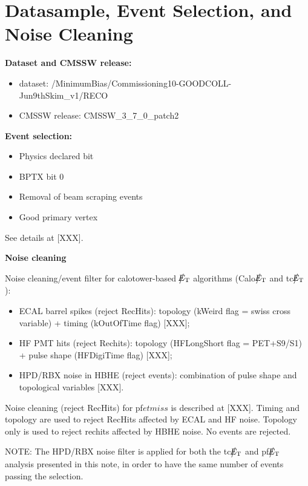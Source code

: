 \section{Datasample, Event Selection, and Noise Cleaning} \label{sec:EventSelection}

{\bf Dataset and CMSSW release:}
\begin{itemize}
\item dataset: /MinimumBias/Commissioning10-GOODCOLL-Jun9thSkim\_v1/RECO
\item CMSSW release: CMSSW\_3\_7\_0\_patch2
\end{itemize}

{\bf Event selection:}
\begin{itemize}
\item Physics declared bit
\item BPTX bit 0
\item Removal of beam scraping events
\item Good primary vertex
\end{itemize}
See details at [XXX].

{\bf Noise cleaning}

Noise cleaning/event filter for calotower-based $\big\slash\hspace{-1.6ex}{E_\text{T}}$ algorithms (Calo$\big\slash\hspace{-1.6ex}{E_\text{T}}$ and tc$\big\slash\hspace{-1.6ex}{E_\text{T}}$):
\begin{itemize}
\item ECAL barrel spikes (reject RecHits): topology (kWeird flag = swiss cross variable) + timing (kOutOfTime flag) [XXX];
\item HF PMT hits (reject Rechits): topology (HFLongShort flag = PET+S9/S1) + pulse shape (HFDigiTime flag) [XXX];
\item HPD/RBX noise in HBHE (reject events): combination of pulse shape and topological variables [XXX].
\end{itemize}

Noise cleaning (reject RecHits) for pf$etmiss$ is described at [XXX]. Timing and topology are used to reject RecHits 
affected by ECAL and HF noise. Topology only is used to reject rechits affected by HBHE noise. No events are rejected.

NOTE: The HPD/RBX noise filter is applied for both the tc$\big\slash\hspace{-1.6ex}{E_\text{T}}$ and pf$\big\slash\hspace{-1.6ex}{E_\text{T}}$ analysis presented in this note, 
in order to have the same number of events passing the selection.

